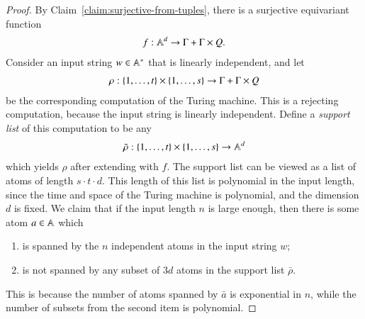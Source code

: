\begin{proof}
By Claim~\ref{claim:surjective-from-tuples}, there is a  surjective equivariant function
\begin{align*}
f : \mathbb A^d \to \Gamma + \Gamma \times Q.
\end{align*}
	Consider an input string $w \in \mathbb A^*$ that is linearly independent, and let 
	\begin{align*}
		\rho : \{1,\ldots,t\} \times \{1,\ldots,s\} \to \Gamma + \Gamma \times Q
	\end{align*}
	be   the corresponding computation of the Turing machine. This is a rejecting computation, because the input string is linearly independent. Define a \emph{support list} of this computation to be any 
	\begin{align*}
		\bar \rho : \{1,\ldots,t\} \times \{1,\ldots,s\} \to \mathbb A^d
	\end{align*}
	which yields $\rho$ after extending with $f$. The support list  can be viewed as a list of atoms of length $s\cdot t \cdot d$. This length of this list is polynomial in the input length, since the time and space of the Turing machine is polynomial, and the dimension $d$ is fixed. We claim that if the input length $n$ is large enough, then there is some atom $a \in \mathbb A$ which 		\begin{enumerate}
		\item is spanned by the $n$ independent atoms in the input string  $w$;
		\item is not spanned by any subset of $3d$ atoms in the support list  $\bar \rho$.
	\end{enumerate}
	This is because  the number of atoms spanned by $\bar a$ is exponential in $n$, while the number of subsets from the second item is polynomial.  


\end{proof}
